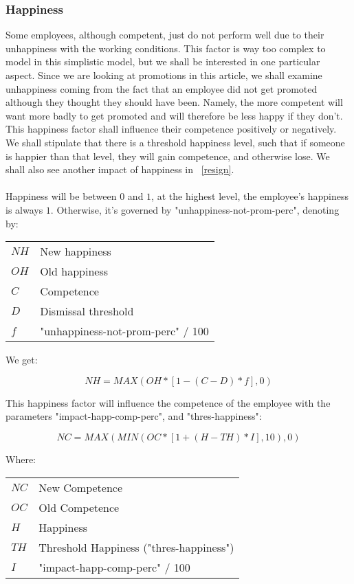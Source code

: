 \documentclass[11pt]{article}
\begin{document}
\subsubsection{Happiness}
\label{happiness}
Some employees, although competent, just do not perform well due to their unhappiness with the working conditions. This factor is way too complex to model in this simplistic model, but we shall be interested in one particular aspect. Since we are looking at promotions in this article, we shall examine unhappiness coming from the fact that an employee did not get promoted although they thought they should have been. Namely, the more competent will want more badly to get promoted and will therefore be less happy if they don't. This happiness factor shall influence their competence positively or negatively. We shall stipulate that there is a threshold happiness level, such that if someone is happier than that level, they will gain competence, and otherwise lose. We shall also see another impact of happiness in ~\ref{resign}.\\
\\
Happiness will be between $0$ and $1$, at the highest level, the employee's happiness is always $1$. Otherwise, it's governed by "unhappiness-not-prom-perc", denoting by:

\begin{tabular}{l l}
$NH$ & New happiness       \\
$OH$ & Old happiness       \\
$C$  & Competence          \\
$D$  & Dismissal threshold \\
$f$  & "unhappiness-not-prom-perc" / 100 \\
\end{tabular}

We get:

\begin{equation}
NH = MAX(OH * \left[1 - (C - D) * f\right], 0)
\end{equation}

This happiness factor will influence the competence of the employee with the parameters "impact-happ-comp-perc", and "thres-happiness":

\begin{equation}
NC = MAX(MIN(OC * \left[1 + (H - TH) * I\right], 10), 0)
\end{equation}

Where:

\begin{tabular}{l l}
$NC$ & New Competence \\
$OC$ & Old Competence \\
$H$  & Happiness \\
$TH$ & Threshold Happiness ("thres-happiness") \\
$I$  & "impact-happ-comp-perc" / 100 \\
\end{tabular}
\end{document}
